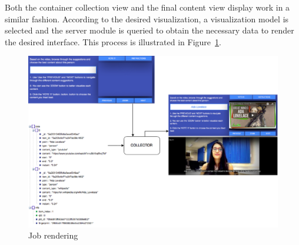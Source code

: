 Both the container collection view and the final content view display work in a similar fashion. According to the desired visualization, a visualization model is selected and the server module is queried to obtain the necessary data to render the desired interface. This process is illustrated in Figure~\ref{rendering}.



\begin{figure}[h!]
	\centerline{\includegraphics[scale=0.28] {figure/rendering}}
	\caption{Job rendering}
	\label{rendering}
\end{figure}




















